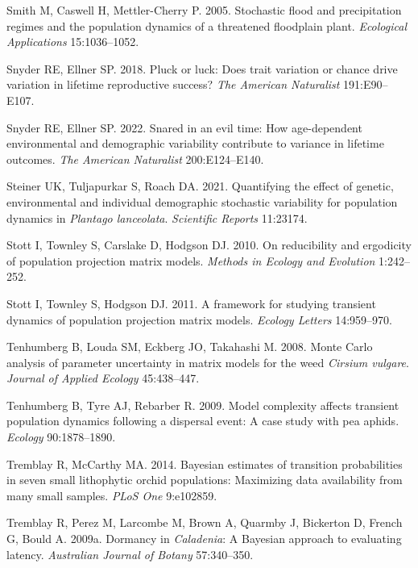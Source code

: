 \documentclass[
  12pt,
  letterpaper,
]{book}
\newlength{\cslhangindent}
\newenvironment{CSLReferences}[2] %
 {\begin{list}{}{%
  \setlength{\itemindent}{0pt}
  \setlength{\leftmargin}{0pt}
  \setlength{\parsep}{0pt}
  \ifodd #1
   \setlength{\leftmargin}{\cslhangindent}
   \setlength{\itemindent}{-1\cslhangindent}
  \fi
  \setlength{\itemsep}{#2\baselineskip}}}
 {\end{list}}
\begin{document}
\begin{CSLReferences}{1}{0}
Smith M, Caswell H, Mettler-Cherry P. 2005. Stochastic flood and
precipitation regimes and the population dynamics of a threatened
floodplain plant. \emph{Ecological Applications} 15:1036--1052.

Snyder RE, Ellner SP. 2018. Pluck or luck: Does trait variation or
chance drive variation in lifetime reproductive success? \emph{The
American Naturalist} 191:E90--E107.

Snyder RE, Ellner SP. 2022. Snared in an evil time: How age-dependent
environmental and demographic variability contribute to variance in
lifetime outcomes. \emph{The American Naturalist} 200:E124--E140.

Steiner UK, Tuljapurkar S, Roach DA. 2021. Quantifying the effect of
genetic, environmental and individual demographic stochastic variability
for population dynamics in \emph{{P}lantago {l}anceolata}.
\emph{Scientific Reports} 11:23174.

Stott I, Townley S, Carslake D, Hodgson DJ. 2010. On reducibility and
ergodicity of population projection matrix models. \emph{Methods in
Ecology and Evolution} 1:242--252.

Stott I, Townley S, Hodgson DJ. 2011. A framework for studying transient
dynamics of population projection matrix models. \emph{Ecology Letters}
14:959--970.

Tenhumberg B, Louda SM, Eckberg JO, Takahashi M. 2008. Monte {C}arlo
analysis of parameter uncertainty in matrix models for the weed
\emph{{C}irsium {v}ulgare}. \emph{Journal of Applied Ecology}
45:438--447.

Tenhumberg B, Tyre AJ, Rebarber R. 2009. Model complexity affects
transient population dynamics following a dispersal event: A case study
with pea aphids. \emph{Ecology} 90:1878--1890.

Tremblay R, McCarthy MA. 2014. Bayesian estimates of transition
probabilities in seven small lithophytic orchid populations: Maximizing
data availability from many small samples. \emph{PLoS One} 9:e102859.

Tremblay R, Perez M, Larcombe M, Brown A, Quarmby J, Bickerton D, French
G, Bould A. 2009a. Dormancy in \emph{{C}aladenia}: A {B}ayesian approach
to evaluating latency. \emph{Australian Journal of Botany} 57:340--350.


\end{CSLReferences}
\end{document}
